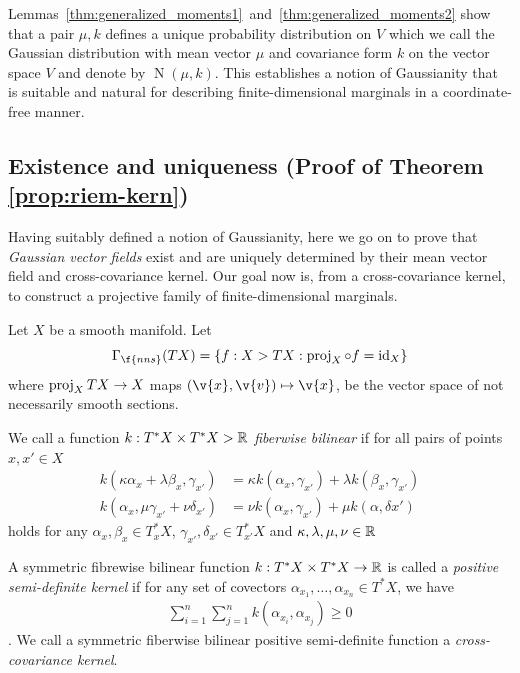 Lemmas~\ref{thm:generalized_moments1}~and~\ref{thm:generalized_moments2} show that a pair $\mu, k$ defines a unique probability distribution on $V$ which we call the Gaussian distribution with mean vector $\mu$ and covariance form $k$ on the vector space $V$ and denote by $\operatorname{N}(\mu, k)$.
This establishes a notion of Gaussianity that is suitable and natural for describing finite-dimensional marginals in a coordinate-free manner.

\subsection*{Existence and uniqueness (Proof of Theorem \ref{prop:riem-kern})}

Having suitably defined a notion of Gaussianity, here we go on to prove that \emph{Gaussian vector fields} exist and are uniquely determined by their mean vector field and cross-covariance kernel.
Our goal now is, from a cross-covariance kernel, to construct a projective family of finite-dimensional marginals.

\begin{definition}
	Let $X$ be a smooth manifold.
	Let \[ \Gamma_{\f{nns}}(TX) = \{f : X \-> TX : \proj_X \after f = \id_X\} \] where $\operatorname{proj}_X TX \to X$ maps $(\v{x},\v{v}) \mapsto \v{x}$, be the vector space of not necessarily smooth sections.
\end{definition}

\begin{definition}
	We call a function $k : T^*X \times T^*X \-> \mathbb{R}$ \emph{fiberwise bilinear} if for all pairs of points $x, x' \in X$
	\begin{align}
		k(\kappa \alpha_x + \lambda \beta_x, \gamma_{x'}) & = \kappa k(\alpha_x, \gamma_{x'}) + \lambda k(\beta_x, \gamma_{x'}) \\
		k( \alpha_x, \mu \gamma_{x'} + \nu \delta_{x'})   & = \nu k(\alpha_x, \gamma_{x'}) + \mu k(\alpha, \delta{x'})
	\end{align}
	holds for any $\alpha_x, \beta_x \in T^*_x X$, $\gamma_{x'}, \delta_{x'} \in T^*_{x'}
		X$ and $\kappa, \lambda, \mu, \nu \in \mathbb{R}$ \end{definition} 

\begin{definition} A symmetric fibrewise bilinear function $k: T^*X \times T^*X \to \mathbb{R}$ is called a \emph{positive semi-definite kernel} if for any set of covectors $\alpha_{x_1}, \ldots, \alpha_{x_n} \in T^*X$, we have \begin{align} \label{eqn:fiber_pd} \sum_{i=1}^n\sum_{j=1}^n k(\alpha_{x_i}, \alpha_{x_j}) \geq 0 \end{align}.
	We call a symmetric fiberwise bilinear positive semi-definite function a \emph{cross-covariance kernel}.
\end{definition}

